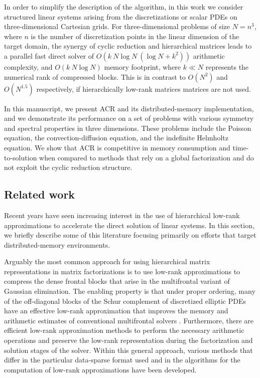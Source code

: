 \documentclass[]{elsarticle}
\begin{document}
In order to simplify the description of the algorithm, in this work we consider structured linear systems arising from the discretizations or scalar PDEs on three-dimensional Cartesian grids. For three-dimensional problems of size $N=n^3$, where $n$ is the number of discretization points in the linear dimension of the target domain, the synergy of cyclic reduction and hierarchical matrices leads to a parallel fast direct solver of $O(k~N \log N~(\log N + k^2))$ arithmetic complexity, and $O(k~N \log N)$ memory footprint, where $k \ll N$ represents the numerical rank of compressed blocks. This is in contrast to $O(N^2)$ and $O(N^{1.5})$ respectively, if hierarchically low-rank matrices matrices are not used.

In this manuscript, we present ACR and its distributed-memory implementation, and we demonstrate its performance on a set of problems with various symmetry and spectral properties in three dimensions. These problems include the Poisson equation, the convection-diffusion equation, and the indefinite Helmholtz equation. We show that ACR is competitive in memory consumption and time-to-solution when compared to methods that rely on a global factorization and do not exploit the cyclic reduction structure.

\subsection{Related work}

Recent years have seen increasing interest in the use of hierarchical low-rank approximations to accelerate the direct solution of linear systems. In this section, we briefly describe some of this literature focusing primarily on efforts that target distributed-memory environments.

Arguably the most common approach for using hierarchical matrix representations in matrix factorizations is to use low-rank approximations to compress the dense frontal blocks that arise in the multifrontal variant of Gaussian elimination. The enabling property is that under proper ordering, many of the off-diagonal blocks of the Schur complement of discretized elliptic PDEs have an effective low-rank approximation \cite{chandrasekaran2010} that improves the memory and arithmetic estimates of conventional multifrontal solvers \cite{Duff83}. Furthermore, there are efficient low-rank approximation methods to perform the necessary arithmetic operations and preserve the low-rank representation during the factorization and solution stages of the solver. Within this general approach, various methods that differ in the particular data-sparse format used and in the algorithms for the computation of low-rank approximations have been developed.
\end{document}
